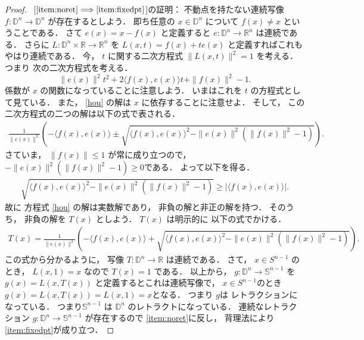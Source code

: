 \documentclass[leqno, a4paper, 12pt]{jsarticle}
\theoremstyle{plain}
\theoremstyle{definition}
\theoremstyle{remark}
\newcommand{\To}{\Longrightarrow}
\newcommand{\rr}{\mathbb{R}}
\newcommand{\yospfont}[1]{\mathbb{#1}}
\newcommand{\yodisc}[1]{\yospfont{D}^{#1}}
\newcommand{\yosphere}[1]{\yospfont{S}^{#1}}
\numberwithin{equation}{section}
\begin{document}
\begin{proof}\ 
[$\ref{item:noret}\To \ref{item:fixedpt}$]の証明：
不動点を持たない連続写像
$f\colon \yodisc{n}\to \yodisc{n}$
が存在するとしよう．
即ち任意の
$x\in \yodisc{n}$
について
$f(x)\neq x$
ということである．
さて
$e(x)=x-f(x)$
と定義すると
$e\colon \yodisc{n}\to \rr^{n}$
は連続である．
さらに
$L\colon \yodisc{n} \times \rr\to \rr^n$
を
$L(x, t)=f(x)+te(x)$
と定義すればこれもやはり連続である．
今，
$t$
に関する二次方程式
$\|L(x,t)\|^2=1$
を考える．
つまり
次の二次方程式を考える．
\begin{equation}\label{hou}
\|e(x)\|^2t^2+2\langle f(x), e(x)\rangle t+\|f(x)\|^2-1. 
\end{equation}
係数が
$x$
の関数になっていることに注意しよう．
いまはこれを
$t$
の方程式として見ている．
また，
\eqref{hou}
の解は
$x$
に依存することに注意せよ．
そして，
この二次方程式の二つの解は以下の式で表される．
\begin{align}
\frac{1}{\|e(x)\|^2}\left(-\langle f(x), e(x)\rangle\pm\sqrt{\langle f(x),e(x)\rangle^2-\|e(x)\|^2(\|f(x)\|^2-1)}\right). 
\end{align}
さていま，
$\|f(x)\|\le 1$
が常に成り立つので，
$-\|e(x)\|^2(\|f(x)\|^2-1)\ge 0$である．
よって以下を得る．
\begin{align}
\sqrt{\langle f(x),e(x)\rangle^2-\|e(x)\|^2(\|f(x)\|^2-1)}\ge |\langle f(x),e(x)\rangle|. 
\end{align}
故に
方程式
\eqref{hou}
の解は実数解であり，
非負の解と非正の解を持つ．
そのうち，
非負の解を
$T(x)$
としよう．
$T(x)$
は明示的に
以下の式でかける．
\begin{align}
T(x)=\frac{1}{\|e(x)\|^2}\left(-\langle f(x), e(x)\rangle+\sqrt{\langle f(x),e(x)\rangle^2-\|e(x)\|^2(\|f(x)\|^2-1)}\right). 
\end{align}
この式から分かるように，
写像
$T\colon \yodisc{n}\to \rr$
は連続である．
さて，
$x\in S^{n-1}$
のとき，
$L(x,1)=x$
なので
$T(x)=1$
である．
以上から，
$g\colon \yodisc{n}\to \yosphere{n-1}$
を
$g(x)=L(x,T(x))$
と定義するとこれは連続写像で，
$x\in S^{n-1}$のとき
$g(x)=L(x,T(x))=L(x,1)=x$となる．
つまり
$g$は
レトラクションになっている．
つまり$\yosphere{n-1}$
は
$\yodisc{n}$
のレトラクトになっている．
連続なレトラクション
$g\colon \yodisc{n}\to \yosphere{n-1}$
が存在するので
\ref{item:noret}に反し，
背理法により
\ref{item:fixedpt}が成り立つ．


\end{proof}
\end{document}
